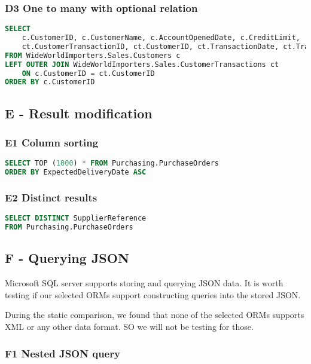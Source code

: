 \subsubsection*{D3 One to many with optional relation}

\begin{lstlisting}[language=SQL]
SELECT 
    c.CustomerID, c.CustomerName, c.AccountOpenedDate, c.CreditLimit, 
    ct.CustomerTransactionID, ct.CustomerID, ct.TransactionDate, ct.TransactionAmount
FROM WideWorldImporters.Sales.Customers c
LEFT OUTER JOIN WideWorldImporters.Sales.CustomerTransactions ct
    ON c.CustomerID = ct.CustomerID
ORDER BY c.CustomerID
\end{lstlisting}

\subsection{E - Result modification}

\subsubsection*{E1 Column sorting}

\begin{lstlisting}[language=SQL]
SELECT TOP (1000) * FROM Purchasing.PurchaseOrders 
ORDER BY ExpectedDeliveryDate ASC
\end{lstlisting}

\subsubsection*{E2 Distinct results}

\begin{lstlisting}[language=SQL]
SELECT DISTINCT SupplierReference 
FROM Purchasing.PurchaseOrders
\end{lstlisting}

\subsection{F - Querying JSON}
Microsoft SQL server supports storing and querying JSON data\cite{mssqljson}. It is worth testing if our selected ORMs support constructing queries into the stored JSON.

During the static comparison, we found that none of the selected ORMs supports XML or any other data format. SO we will not be testing for those.

\subsubsection*{F1 Nested JSON query}

